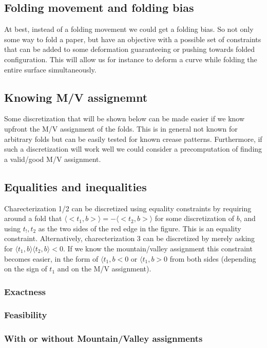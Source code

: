 \documentclass{article}
\theoremstyle{definition}
\begin{document}
\subsection{Folding movement and folding bias}
At best, instead of a folding movement we could get a folding bias. So not only some way to fold a paper, but have an objective with a possible set of constraints that can be added to some deformation guaranteeing or pushing towards folded configuration. This will allow us for instance to deform a curve while folding the entire surface simultaneously.

\subsection{Knowing M/V assignemnt}
Some discretization that will be shown below can be made easier if we know upfront the M/V assignment of the folds. This is in general not known for arbitrary folds but can be easily tested for known crease patterns. Furthermore, if such a discretization will work well we could consider a precomputation of finding a valid/good M/V assignment.

\subsection{Equalities and inequalities}
Charecterization 1/2 can be discretized using equality constraints by requiring around a fold that  $\langle <t_1,b> \rangle = -\langle <t_2,b> \rangle$ for some discretization of $b$, and using $t_!,t_2$ as the two sides of the red edge in the figure. This is an equality constraint. Alternatively, charecterization 3 can be discretized by merely asking for $\langle t_1,b \rangle \langle t_2,b \rangle < 0$. If we know the mountain/valley assignment this constraint becomes easier, in the form of $\langle t_1,b < 0$ or $\langle t_1,b > 0$ from both sides (depending on the sign of $t_1$ and on the M/V assignment).
\subsubsection{Exactness}
\subsubsection{Feasibility}
\subsubsection{With or without Mountain/Valley assignments}


%
%
\end{document}
